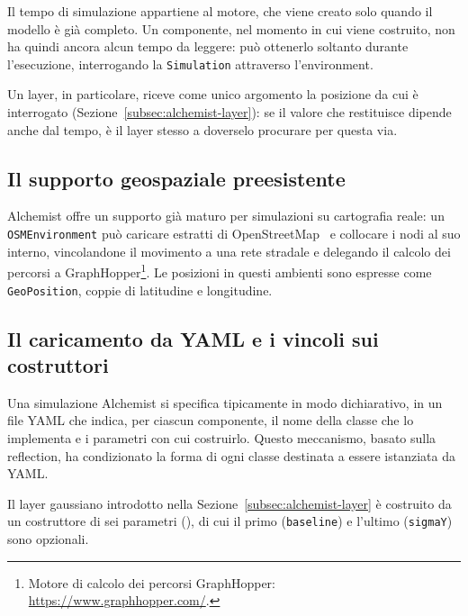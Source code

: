 Il tempo di simulazione appartiene al motore, che viene creato solo quando il modello è
già completo. Un componente, nel momento in cui viene costruito, non ha quindi ancora
alcun tempo da leggere: può ottenerlo soltanto durante l'esecuzione, interrogando la
\texttt{Simulation} attraverso l'environment.

Un layer, in particolare, riceve come unico argomento la posizione da cui è interrogato
(Sezione~\ref{subsec:alchemist-layer}): se il valore che restituisce dipende anche dal
tempo, è il layer stesso a doverselo procurare per questa via.

\subsection{Il supporto geospaziale preesistente}
\label{subsec:alchemist-osm}

Alchemist offre un supporto già maturo per simulazioni su cartografia
reale: un \texttt{OSMEnvironment} può caricare estratti di OpenStreetMap~\cite{osm} e collocare i
nodi al suo interno, vincolandone il movimento a una rete stradale e delegando il calcolo
dei percorsi a GraphHopper\footnote{Motore di calcolo dei percorsi GraphHopper: \url{https://www.graphhopper.com/}.}.
Le posizioni in questi ambienti sono espresse come \texttt{GeoPosition}, coppie di
latitudine e longitudine.

\subsection{Il caricamento da YAML e i vincoli sui costruttori}
\label{subsec:alchemist-loader}

Una simulazione Alchemist si specifica tipicamente in modo dichiarativo, in un file YAML
che indica, per ciascun componente, il nome della classe che lo implementa e i parametri
con cui costruirlo. Questo meccanismo, basato sulla reflection, ha condizionato la forma di
ogni classe destinata a essere istanziata da YAML.

Il layer gaussiano introdotto nella Sezione~\ref{subsec:alchemist-layer} è costruito
da un costruttore di sei parametri (), 
di cui il primo (\texttt{baseline}) e l'ultimo
(\texttt{sigmaY}) sono opzionali.

